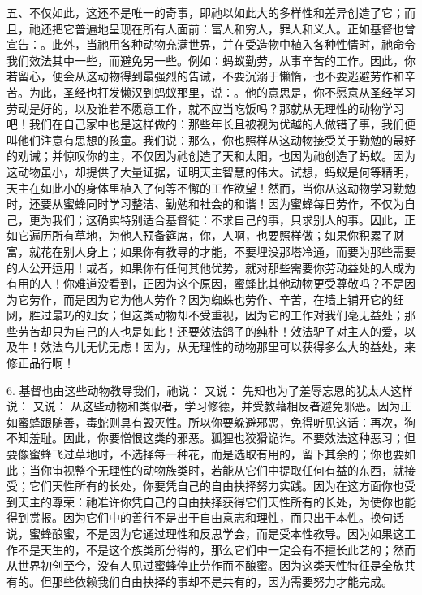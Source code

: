 五、不仅如此，这还不是唯一的奇事，即祂以如此大的多样性和差异创造了它；而且，祂还把它普遍地呈现在所有人面前：富人和穷人，罪人和义人。正如基督也曾宣告：。此外，当祂用各种动物充满世界，并在受造物中植入各种性情时，祂命令我们效法其中一些，而避免另一些。例如：蚂蚁勤劳，从事辛苦的工作。因此，你若留心，便会从这动物得到最强烈的告诫，不要沉溺于懒惰，也不要逃避劳作和辛苦。为此，圣经也打发懒汉到蚂蚁那里，说：。他的意思是，你不愿意从圣经学习劳动是好的，以及谁若不愿意工作，就不应当吃饭吗？那就从无理性的动物学习吧！我们在自己家中也是这样做的：那些年长且被视为优越的人做错了事，我们便叫他们注意有思想的孩童。我们说：那么，你也照样从这动物接受关于勤勉的最好的劝诫；并惊叹你的主，不仅因为祂创造了天和太阳，也因为祂创造了蚂蚁。因为这动物虽小，却提供了大量证据，证明天主智慧的伟大。试想，蚂蚁是何等精明，天主在如此小的身体里植入了何等不懈的工作欲望！然而，当你从这动物学习勤勉时，还要从蜜蜂同时学习整洁、勤勉和社会的和谐！因为蜜蜂每日劳作，不仅为自己，更为我们；这确实特别适合基督徒：不求自己的事，只求别人的事。因此，正如它遍历所有草地，为他人预备筵席，你，人啊，也要照样做；如果你积累了财富，就花在别人身上；如果你有教导的才能，不要埋没那塔冷通，而要为那些需要的人公开运用！或者，如果你有任何其他优势，就对那些需要你劳动益处的人成为有用的人！你难道没看到，正因为这个原因，蜜蜂比其他动物更受尊敬吗？不是因为它劳作，而是因为它为他人劳作？因为蜘蛛也劳作、辛苦，在墙上铺开它的细网，胜过最巧的妇女；但这类动物却不受重视，因为它的工作对我们毫无益处；那些劳苦却只为自己的人也是如此！还要效法鸽子的纯朴！效法驴子对主人的爱，以及牛！效法鸟儿无忧无虑！因为，从无理性的动物那里可以获得多么大的益处，来修正品行啊！\par

6. 基督也由这些动物教导我们，祂说： 又说： 先知也为了羞辱忘恩的犹太人这样说： 又说： 从这些动物和类似者，学习修德，并受教藉相反者避免邪恶。因为正如蜜蜂跟随善，毒蛇则具有毁灭性。所以你要躲避邪恶，免得听见这话：再次，狗不知羞耻。因此，你要憎恨这类的邪恶。狐狸也狡猾诡诈。不要效法这种恶习；但要像蜜蜂飞过草地时，不选择每一种花，而是选取有用的，留下其余的；你也要如此；当你审视整个无理性的动物族类时，若能从它们中提取任何有益的东西，就接受；它们天性所有的长处，你要凭自己的自由抉择努力实践。因为在这方面你也受到天主的尊荣：祂准许你凭自己的自由抉择获得它们天性所有的长处，为使你也能得到赏报。因为它们中的善行不是出于自由意志和理性，而只出于本性。换句话说，蜜蜂酿蜜，不是因为它通过理性和反思学会，而是受本性教导。因为如果这工作不是天生的，不是这个族类所分得的，那么它们中一定会有不擅长此艺的；然而从世界初创至今，没有人见过蜜蜂停止劳作而不酿蜜。因为这类天性特征是全族共有的。但那些依赖我们自由抉择的事却不是共有的，因为需要努力才能完成。\par

